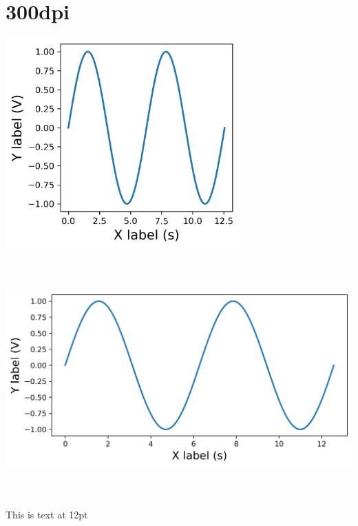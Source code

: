 \documentclass[12pt,a4paper]{article}
\begin{document}
\section*{300dpi}
\begin{center}
\includegraphics[width=3.54in]{300dpi.png}
\end{center}
\begin{center}
\includegraphics[width=7.25in, height=3.54in]{300dpi-full.png}
\end{center}
This is text at 12pt
\end{document}
